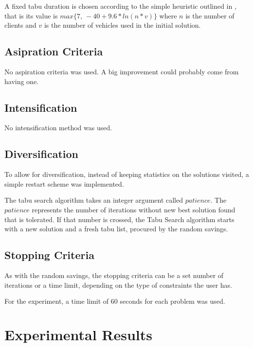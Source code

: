\documentclass{article} %
\begin{document}
{A fixed tabu duration is chosen according to the simple heuristic outlined in \citep{osman1993}, that is its value is
$max\{7,\ -40+9.6*ln(n * v)\}$
where $n$ is the number of clients and $v$ is the number of vehicles used in the initial solution.


\subsection{Asipration Criteria}
No aspiration criteria was used. A big improvement could probably come from having one.


\subsection{Intensification}
No intensification method was used.


\subsection{Diversification}

To allow for diversification, instead of keeping statistics on the solutions visited, a simple restart scheme was implemented.\newline

The tabu search algorithm takes an integer argument called $patience$. The $patience$ represents the number of iterations without new best solution found that is tolerated. If that number is crossed, the Tabu Search algorithm starts with a new solution and a fresh tabu list, procured by the random savings.


\subsection{Stopping Criteria}

As with the random savings, the stopping criteria can be a set number of iterations or a time limit, depending on the type of constraints the user has.\newline

For the experiment, a time limit of 60 seconds for each problem was used.


\newpage
\section{Experimental Results}
\label{exp_results}

}
\end{document}
